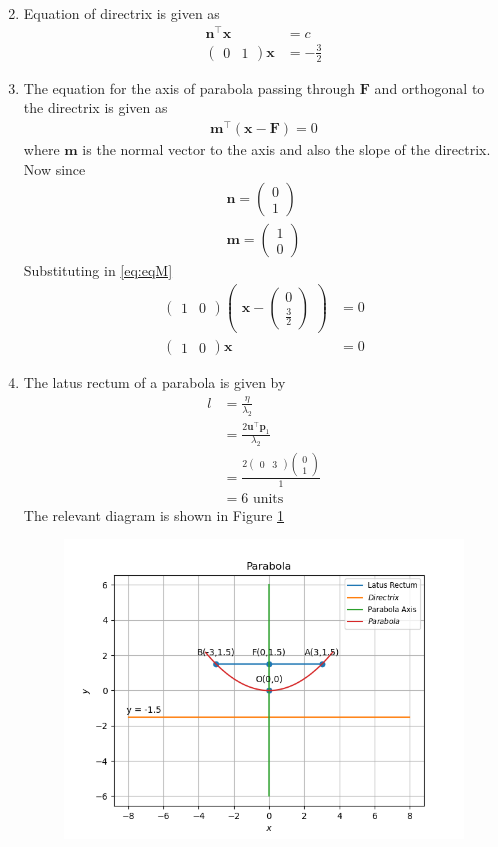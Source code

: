 \documentclass[12pt]{article}
\providecommand{\brak}[1]{\ensuremath{\left(#1\right)}}
\newcommand{\myvec}[1]{\ensuremath{\begin{pmatrix}#1\end{pmatrix}}}
\let\vec\mathbf
\begin{document}
\begin{enumerate}
\begin{align}
\end{align}
\item Equation of directrix is given as
\begin{align}
	\vec{n}^\top \vec{x} &= c\\
	\myvec{0&1}\vec{x} &= -\frac{3}{2}
\end{align}
\item The equation for the axis of parabola passing through $\vec{F}$ and orthogonal to the directrix is given as
\begin{align}
	\label{eq:eqM}
	\vec{m}^\top \brak{\vec{x}-\vec{F}} = 0
\end{align}
where $\vec{m}$ is the normal vector to the axis and also the slope of the directrix. Now since
\begin{align}
	\vec{n} = \myvec{0\\1}\\
	\vec{m} = \myvec{1\\0}
\end{align}
Substituting in \eqref{eq:eqM}
\begin{align}
	\myvec{1&0}\myvec{\vec{x}-\myvec{0\\\frac{3}{2}}}&=0\\
	\myvec{1&0}\vec{x} &= 0
\end{align}
\item The latus rectum of a parabola is given by
\begin{align}
	l&=\frac{\eta}{\lambda_2}\\
	 &=\frac{2\vec{u}^\top \vec{p}_1}{\lambda_2}\\
	 &=\frac{2\myvec{0&3}\myvec{0\\1}}{1}\\
	 &=6 \text{ units }
\end{align}
The relevant diagram is shown in Figure \ref{fig:Fig1}
\begin{figure}[!h]
	\begin{center} 
	    \includegraphics[width=\columnwidth]{figs/parabola}
	\end{center}
\caption{}
\label{fig:Fig1}
\end{figure}

\end{enumerate}
\end{document}
